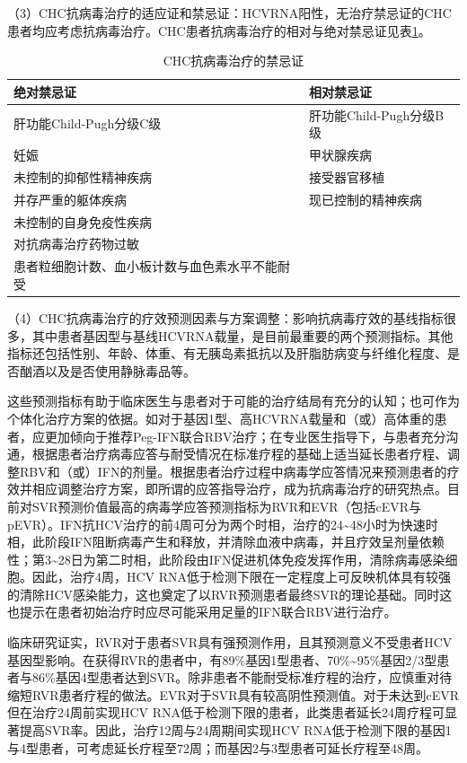 （3）CHC抗病毒治疗的适应证和禁忌证：HCVRNA阳性，无治疗禁忌证的CHC患者均应考虑抗病毒治疗。CHC患者抗病毒治疗的相对与绝对禁忌证见表\ref{tab3-10-5}。

\begin{table}[htbp]
    \centering
    \caption{CHC抗病毒治疗的禁忌证}
    \label{tab3-10-5}
    \begin{tabular}{ll}
\toprule
绝对禁忌证 & 相对禁忌证\tabularnewline
\midrule
肝功能Child-Pugh分级C级 & 肝功能Child-Pugh分级B级\tabularnewline
妊娠 & 甲状腺疾病\tabularnewline
未控制的抑郁性精神疾病 & 接受器官移植\tabularnewline
并存严重的躯体疾病 & 现已控制的精神疾病\tabularnewline
未控制的自身免疫性疾病 &\tabularnewline
对抗病毒治疗药物过敏 &\tabularnewline
患者粒细胞计数、血小板计数与血色素水平不能耐受 &\tabularnewline
\bottomrule
    \end{tabular}
\end{table}

（4）CHC抗病毒治疗的疗效预测因素与方案调整：影响抗病毒疗效的基线指标很多，其中患者基因型与基线HCVRNA载量，是目前最重要的两个预测指标。其他指标还包括性别、年龄、体重、有无胰岛素抵抗以及肝脂肪病变与纤维化程度、是否酗酒以及是否使用静脉毒品等。

这些预测指标有助于临床医生与患者对于可能的治疗结局有充分的认知；也可作为个体化治疗方案的依据。如对于基因1型、高HCVRNA载量和（或）高体重的患者，应更加倾向于推荐Peg-IFN联合RBV治疗；在专业医生指导下，与患者充分沟通，根据患者治疗病毒应答与耐受情况在标准疗程的基础上适当延长患者疗程、调整RBV和（或）IFN的剂量。根据患者治疗过程中病毒学应答情况来预测患者的疗效并相应调整治疗方案，即所谓的应答指导治疗，成为抗病毒治疗的研究热点。目前对SVR预测价值最高的病毒学应答预测指标为RVR和EVR（包括cEVR与pEVR）。IFN抗HCV治疗的前4周可分为两个时相，治疗的24\textasciitilde{}48小时为快速时相，此阶段IFN阻断病毒产生和释放，并清除血液中病毒，并且疗效呈剂量依赖性；第3\textasciitilde{}28日为第二时相，此阶段由IFN促进机体免疫发挥作用，清除病毒感染细胞。因此，治疗4周，HCV
RNA低于检测下限在一定程度上可反映机体具有较强的清除HCV感染能力，这也奠定了以RVR预测患者最终SVR的理论基础。同时这也提示在患者初始治疗时应尽可能采用足量的IFN联合RBV进行治疗。

临床研究证实，RVR对于患者SVR具有强预测作用，且其预测意义不受患者HCV基因型影响。在获得RVR的患者中，有89\%基因1型患者、70\%\textasciitilde{}95\%基因2/3型患者与86\%基因4型患者达到SVR。除非患者不能耐受标准疗程的治疗，应慎重对待缩短RVR患者疗程的做法。EVR对于SVR具有较高阴性预测值。对于未达到cEVR但在治疗24周前实现HCV
RNA低于检测下限的患者，此类患者延长24周疗程可显著提高SVR率。因此，治疗12周与24周期间实现HCV
RNA低于检测下限的基因1与4型患者，可考虑延长疗程至72周；而基因2与3型患者可延长疗程至48周。

